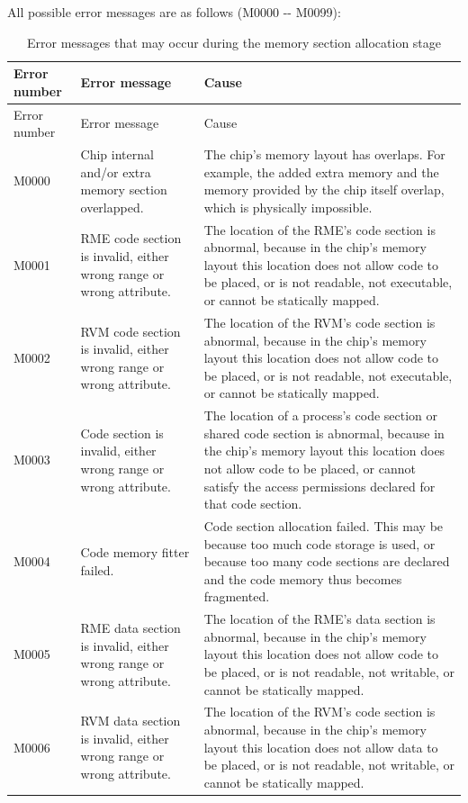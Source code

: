 All possible error messages are as follows (M0000 -\/- M0099):

\begin{xltabular}{\textwidth}{@{}>{\hsize\raggedright\arraybackslash}X>{\hsize\raggedright\arraybackslash}X>{\hsize\raggedright\arraybackslash}X@{}}
\caption{Error messages that may occur during the memory section allocation stage}\label{tab:5-19}\\
\toprule
Error number & Error message & Cause\tabularnewline
\endfirsthead
\toprule
Error number & Error message & Cause\tabularnewline
\midrule
\endhead
\bottomrule
\endlastfoot
M0000 & Chip internal and/or extra memory section overlapped. &
The chip's memory layout has overlaps. For example, the added extra memory and the memory provided by the chip itself overlap, which is physically impossible.\tabularnewline
M0001 & RME code section is invalid, either wrong range or wrong
attribute. &
The location of the RME's code section is abnormal, because in the chip's memory layout this location does not allow code to be placed, or is not readable, not executable, or cannot be statically mapped.\tabularnewline
M0002 & RVM code section is invalid, either wrong range or wrong
attribute. &
The location of the RVM's code section is abnormal, because in the chip's memory layout this location does not allow code to be placed, or is not readable, not executable, or cannot be statically mapped.\tabularnewline
M0003 & Code section is invalid, either wrong range or wrong attribute.
&
The location of a process's code section or shared code section is abnormal, because in the chip's memory layout this location does not allow code to be placed, or cannot satisfy the access permissions declared for that code section.\tabularnewline
M0004 & Code memory fitter failed. &
Code section allocation failed. This may be because too much code storage is used, or because too many code sections are declared and the code memory thus becomes fragmented.\tabularnewline
M0005 & RME data section is invalid, either wrong range or wrong
attribute. &
The location of the RME's data section is abnormal, because in the chip's memory layout this location does not allow code to be placed, or is not readable, not writable, or cannot be statically mapped.\tabularnewline
M0006 & RVM data section is invalid, either wrong range or wrong
attribute. &
The location of the RVM's code section is abnormal, because in the chip's memory layout this location does not allow data to be placed, or is not readable, not writable, or cannot be statically mapped.\tabularnewline

\end{xltabular}
